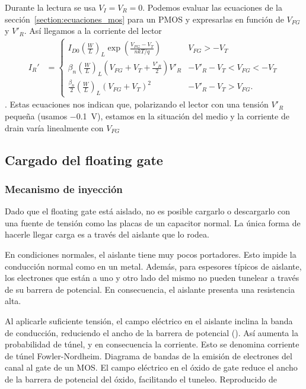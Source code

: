 Durante la lectura se usa $V_I=V_R=0$.
Podemos evaluar las ecuaciones de la sección~\ref{section:ecuaciones_mos}
para un PMOS y expresarlas en función de $V_{FG}$ y $V'_R$.
Así llegamos a la corriente del lector
\begin{align*}
    I_R' &= \begin{cases}
        I_{D0} \left(\frac W L\right)_L
        \exp\left(\frac{V_{FG}-V_T}{nkT/q}\right)& V_{FG}>-V_T\\
        \beta_n\left(\frac W L\right)_L(V_{FG}+V_T+\frac{V'_R}2)V'_R &
        -V'_R-V_T<V_{FG}<-V_T\\
        \frac{\beta_n}2\left(\frac W L\right)_L(V_{FG}+V_T)^2 &
        -V'_R-V_T>V_{FG}.
    \end{cases}
\end{align*}
. Estas ecuaciones nos indican que,
polarizando el lector con una tensión $V'_R$ pequeña
(usamos \SI{-0.1}{\volt}),
estamos en la situación del medio y
la corriente de drain varía linealmente con $V_{FG}$
\subsection{Cargado del floating gate}
%
\subsubsection{Mecanismo de inyección}
Dado que el floating gate está aislado,
no es posible cargarlo o descargarlo con una fuente de tensión
como las placas de un capacitor normal.
La única forma de hacerle llegar carga es 
a través del aislante que lo rodea.

En condiciones normales, el aislante tiene muy pocos portadores.
Esto impide la conducción normal como en un metal.
Además, para espesores típicos de aislante, 
los electrones que están a uno y otro lado del mismo
no pueden tunelear a través de su barrera de potencial.
En consecuencia, el aislante presenta una resistencia alta.

Al aplicarle suficiente tensión,
el campo eléctrico en el aislante inclina la banda de conducción,
reduciendo el ancho de la barrera de potencial
().
Así aumenta la probabilidad de túnel, y en consecuencia la corriente.
Esto se denomina corriente de túnel
Fowler-Nordheim\cite{lenzlinger_fowlernordheim_1969}.
{Diagrama de bandas de la emisión de electrones del canal al gate de un MOS. 
El campo eléctrico en el óxido de gate reduce el ancho de la barrera de
potencial del óxido, facilitando el tuneleo.
Reproducido de \cite{lenzlinger_fowlernordheim_1969}}

